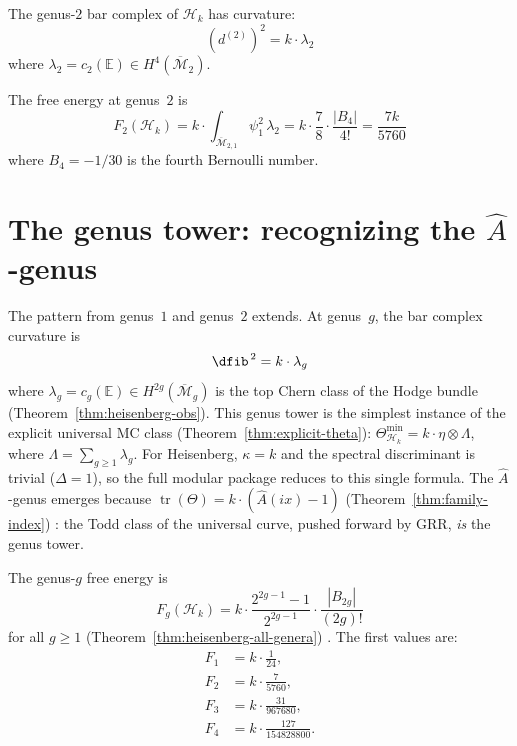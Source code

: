 \begin{theorem}\label{thm:frame-genus2-curvature}
The genus-$2$ bar complex of $\mathcal{H}_k$ has curvature:
\begin{equation}\label{eq:frame-genus2-curvature}
(d^{(2)})^2 = k \cdot \lambda_2
\end{equation}
where $\lambda_2 = c_2(\mathbb{E}) \in H^4(\overline{\mathcal{M}}_2)$.
\end{theorem}

The free energy at genus~$2$ is
\begin{equation}\label{eq:frame-F2}
F_2(\mathcal{H}_k) = k \cdot
\int_{\overline{\mathcal{M}}_{2,1}} \psi_1^2\, \lambda_2
= k \cdot \frac{7}{8} \cdot \frac{|B_4|}{4!}
= \frac{7k}{5760}
\end{equation}
where $B_4 = -1/30$ is the fourth Bernoulli number.

\section{\texorpdfstring{The genus tower: recognizing the $\hat{A}$-genus}{The genus tower: recognizing the A-hat genus}}
\label{sec:frame-genus-tower}

The pattern from genus~$1$ and genus~$2$ extends. At genus~$g$,
the bar complex curvature is
\begin{equation}\label{eq:frame-genus-g-curvature}
\dfib^{\,2} = k \cdot \lambda_g
\end{equation}
where $\lambda_g = c_g(\mathbb{E}) \in H^{2g}(\overline{\mathcal{M}}_g)$
is the top Chern class of the Hodge bundle
(Theorem~\ref{thm:heisenberg-obs}).
This genus tower is the simplest instance of the explicit universal
MC class (Theorem~\ref{thm:explicit-theta}):
$\Theta_{\mathcal{H}_k}^{\min} = k \cdot \eta \otimes \Lambda$,
where $\Lambda = \sum_{g \geq 1}\lambda_g$.
For Heisenberg, $\kappa = k$ and the spectral discriminant is trivial
($\Delta = 1$), so the full modular package reduces to this single
formula. The $\hat{A}$-genus emerges because
$\operatorname{tr}(\Theta) = k \cdot (\hat{A}(ix) - 1)$
\ifannalsedition\else
(Theorem~\ref{thm:family-index})
\fi: the Todd class of the universal
curve, pushed forward by GRR, \emph{is} the genus tower.

The genus-$g$ free energy is
\begin{equation}\label{eq:frame-Fg}
F_g(\mathcal{H}_k) = k \cdot
\frac{2^{2g-1}-1}{2^{2g-1}} \cdot \frac{|B_{2g}|}{(2g)!}
\end{equation}
for all $g \geq 1$ \ifannalsedition\else
(Theorem~\ref{thm:heisenberg-all-genera})
\fi.
The first values are:
\begin{align}
F_1 &= k \cdot \frac{1}{24}, \label{eq:frame-F1} \\
F_2 &= k \cdot \frac{7}{5760}, \label{eq:frame-F2-repeat} \\
F_3 &= k \cdot \frac{31}{967680}, \label{eq:frame-F3} \\
F_4 &= k \cdot \frac{127}{154828800}. \label{eq:frame-F4}
\end{align}

